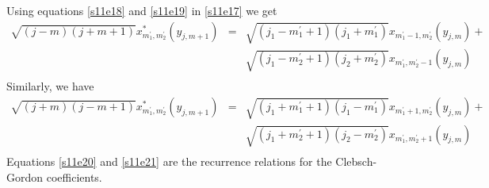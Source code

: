 \documentclass{article}
\numberwithin{equation}{section}
\theoremstyle{plain}
\numberwithin{thm}{section}
\theoremstyle{plain}
\numberwithin{prop}{section}
\theoremstyle{definition}
\numberwithin{defn}{section}
\theoremstyle{remark}
\begin{document}
Using equations \eqref{s11e18} and \eqref{s11e19} in \eqref{s11e17} we get
{\tiny
\begin{eqnarray}
\sqrt{(j-m)(j+m+1)}x_{m_1^\prime,m_2^\prime}^\ast(y_{j,m+1}) &=&
\sqrt{(j_1-m_1^\prime+1)(j_1+m_1^\prime)}x_{m_1^\prime-1,m_2^\prime}
     (y_{j,m}) + \nonumber \\
 & & \sqrt{(j_1-m_2^\prime+1)(j_2+m_2^\prime)}x_{m_1^\prime,m_2^\prime-1}
     (y_{j,m}) \nonumber \\
 & & \label{s11e20}
\end{eqnarray}}
Similarly, we have
{\tiny
\begin{eqnarray}
\sqrt{(j+m)(j-m+1)}x_{m_1^\prime,m_2^\prime}^\ast(y_{j,m+1}) &=&
\sqrt{(j_1+m_1^\prime+1)(j_1-m_1^\prime)}x_{m_1^\prime+1,m_2^\prime}
     (y_{j,m}) + \nonumber \\
 & & \sqrt{(j_1+m_2^\prime+1)(j_2-m_2^\prime)}x_{m_1^\prime,m_2^\prime+1}
     (y_{j,m}) \nonumber \\
 & & \label{s11e21}
\end{eqnarray}}
Equations \eqref{s11e20} and \eqref{s11e21} are the recurrence relations for
the Clebsch-Gordon coefficients.



\end{document}
